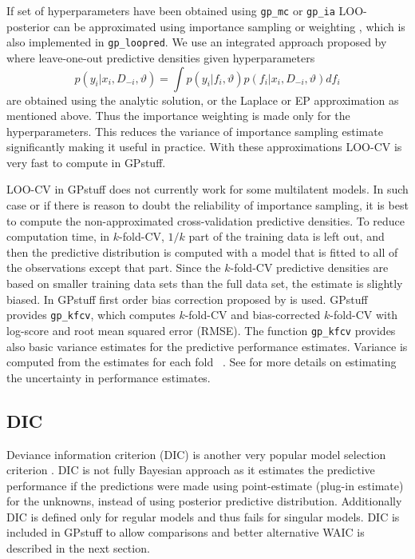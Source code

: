 \documentclass[twoside,11pt]{article}
\newcommand{\pkg}[1]{{\fontseries{b}\selectfont #1}}
\newcommand{\code}[1]{{\normalfont\texttt{#1}}}
\begin{document}
If set of hyperparameters have been obtained using \code{gp\_mc} or
\code{gp\_ia} LOO-posterior can be approximated using importance
sampling or weighting
\citep{Gelfand+Dey+Chang:1992,Vehtari+Lampinen:2002}, which is also
implemented in \code{gp\_loopred}. We use an integrated approach
proposed by \citet[][p. 40]{Vehtari:2001} where leave-one-out
predictive densities given hyperparameters
\begin{equation}
p(y_i|x_i,D_{-i},\vartheta)=\int
p(y_i|f_i,\vartheta)p(f_i|x_i,D_{-i},\vartheta)df_i 
\end{equation}
are obtained using the analytic solution, or the Laplace or EP
approximation as mentioned above. Thus the importance weighting is
made only for the hyperparameters. This reduces the variance of
importance sampling estimate significantly making it useful in
practice. With these approximations LOO-CV is very fast to compute in
GPstuff.

LOO-CV in GPstuff does not currently work for some multilatent
models. In such case or if there is reason to doubt the reliability of
importance sampling, it is best to compute the non-approximated
cross-validation predictive densities.  To reduce computation time, in
$k$-fold-CV, $1/k$ part of the training data is left out, and then the
predictive distribution is computed with a model that is fitted to all
of the observations except that part.  Since the $k$-fold-CV
predictive densities are based on smaller training data sets than the
full data set, the estimate is slightly biased. In \pkg{GPstuff} first
order bias correction proposed by \citet{Burman:1989} is used.
\pkg{GPstuff} provides \code{gp\_kfcv}, which computes $k$-fold-CV and
bias-corrected $k$-fold-CV with log-score and root mean squared error
(RMSE). The function \code{gp\_kfcv} provides also basic variance
estimates for the predictive performance estimates.  Variance is
computed from the estimates for each fold ~\citep[see,
e.g.,][]{Dietterich:1998}.  See
\citet{Vehtari+Lampinen:2002,Vehtari+Ojanen:2012} for more details on
estimating the uncertainty in performance estimates.

\subsection{DIC}

Deviance information criterion (DIC) is another very popular model
selection criterion
\citep[][]{Spiegelhalter+Best+Carlin+Linde:2002}. DIC is not fully
Bayesian approach as it estimates the predictive performance if the
predictions were made using point-estimate (plug-in estimate) for
the unknowns, instead of using posterior predictive distribution.
Additionally DIC is defined only for regular models and thus fails
for singular models. DIC is included in \pkg{GPstuff} to allow
comparisons and better alternative WAIC is described in the next
section.
\end{document}
